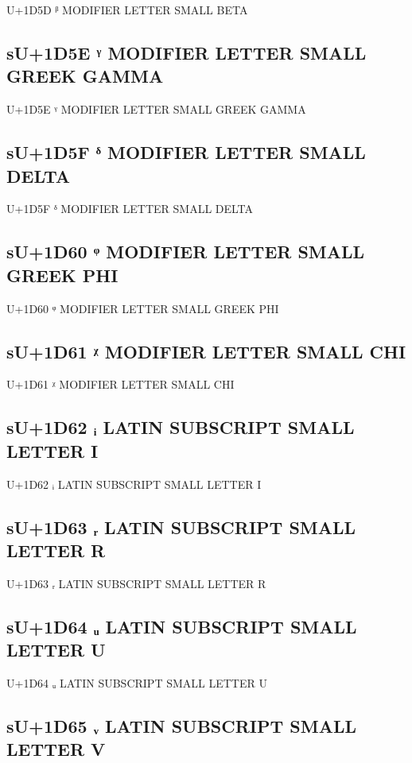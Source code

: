 U+1D5D ᵝ MODIFIER LETTER SMALL BETA

\subsection{sU+1D5E ᵞ MODIFIER LETTER SMALL GREEK GAMMA}

U+1D5E ᵞ MODIFIER LETTER SMALL GREEK GAMMA

\subsection{sU+1D5F ᵟ MODIFIER LETTER SMALL DELTA}

U+1D5F ᵟ MODIFIER LETTER SMALL DELTA

\subsection{sU+1D60 ᵠ MODIFIER LETTER SMALL GREEK PHI}

U+1D60 ᵠ MODIFIER LETTER SMALL GREEK PHI

\subsection{sU+1D61 ᵡ MODIFIER LETTER SMALL CHI}

U+1D61 ᵡ MODIFIER LETTER SMALL CHI

\fi

\subsection{sU+1D62 ᵢ LATIN SUBSCRIPT SMALL LETTER I}

U+1D62 ᵢ LATIN SUBSCRIPT SMALL LETTER I

\subsection{sU+1D63 ᵣ LATIN SUBSCRIPT SMALL LETTER R}

U+1D63 ᵣ LATIN SUBSCRIPT SMALL LETTER R

\subsection{sU+1D64 ᵤ LATIN SUBSCRIPT SMALL LETTER U}

U+1D64 ᵤ LATIN SUBSCRIPT SMALL LETTER U

\subsection{sU+1D65 ᵥ LATIN SUBSCRIPT SMALL LETTER V}

